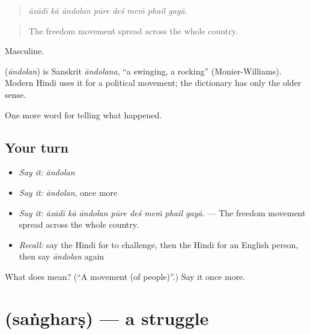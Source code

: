 \begin{quote}
       
\end{quote}

\begin{quote}
\emph{āzādī kā āndolan pūre deś meṁ phail gayā.}
\end{quote}

\begin{quote}
The freedom movement spread across the whole country.
\end{quote}

Masculine.

\begin{cousinweb}
\textbf{} (\emph{āndolan}) is Sanskrit \emph{āndolana}, \textquotedblleft{}a swinging, a rocking\textquotedblright{} (Monier-Williams). Modern Hindi uses it for a political movement; the dictionary has only the older sense.
\end{cousinweb}

\begin{grammarlens}[title={What you've built}]
One more word for telling what happened.
\end{grammarlens}

\subsection*{Your turn}
\begin{itemize}
\raggedright
  \item \emph{Say it:} \emph{āndolan}
  \item \emph{Say it:} \emph{āndolan}, once more
  \item \emph{Say it:} \emph{āzādī kā āndolan pūre deś meṁ phail gayā.} — The freedom movement spread across the whole country.
  \item \emph{Recall:} say the Hindi for to challenge, then the Hindi for an English person, then say \emph{āndolan} again
\end{itemize}

\begin{tcolorbox}[breakable,colback=teal!4,colframe=teal!35!black,title={Before you move on}]
What does  mean? (\textquotedblleft{}A movement (of people)\textquotedblright{}.) Say it once more.
\end{tcolorbox}
\section[\texorpdfstring{\hi{संघर्ष} (saṅgharṣ)}{संघर्ष (saṅgharṣ)}]{ (saṅgharṣ) — a struggle}

